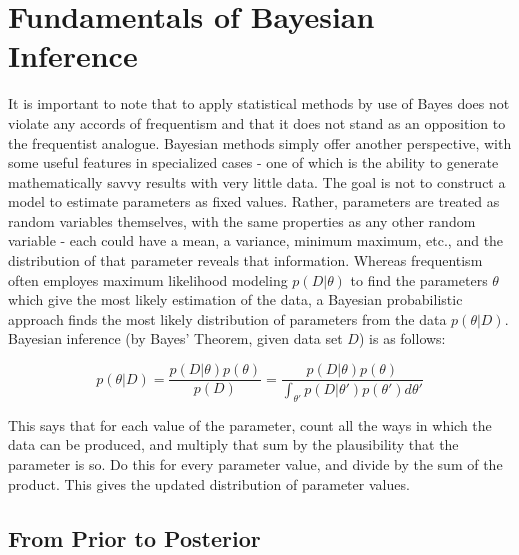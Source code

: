 \section{Fundamentals of Bayesian Inference} %

It is important to note that to apply statistical methods by use of Bayes does not violate any accords of frequentism and that it does not stand as an opposition to the frequentist analogue.  Bayesian methods simply offer another perspective, with some useful features in specialized cases - one of which is the ability to generate mathematically savvy results with very little data.  The goal is not to construct a model to estimate parameters as fixed values. Rather, parameters are treated as random variables themselves, with the same properties as any other random variable - each could have a mean, a variance, minimum maximum, etc., and the distribution of that parameter reveals that information.
Whereas frequentism often employes maximum likelihood modeling $p(D|\theta)$ to find the parameters $\theta$ which give the most likely estimation of the data, a Bayesian probabilistic approach finds the most likely distribution of parameters from the data $p(\theta|D)$\cite{mullachery2018bayesian}.  Bayesian inference (by Bayes' Theorem, given data set $D$) is as follows:

$$
p(\theta|D) = \frac{p(D|\theta)p(\theta)}{p(D)} = \frac{p(D|\theta)p(\theta)}{\int_{\theta'} p(D|\theta')p(\theta')d\theta'}
$$

This says that for each value of the parameter, count all the ways in which the data can be produced, and multiply that sum by the plausibility that the parameter is so.  Do this for every parameter value, and divide by the sum of the product.  This gives the updated distribution of parameter values.


\subsection{From Prior to Posterior}

